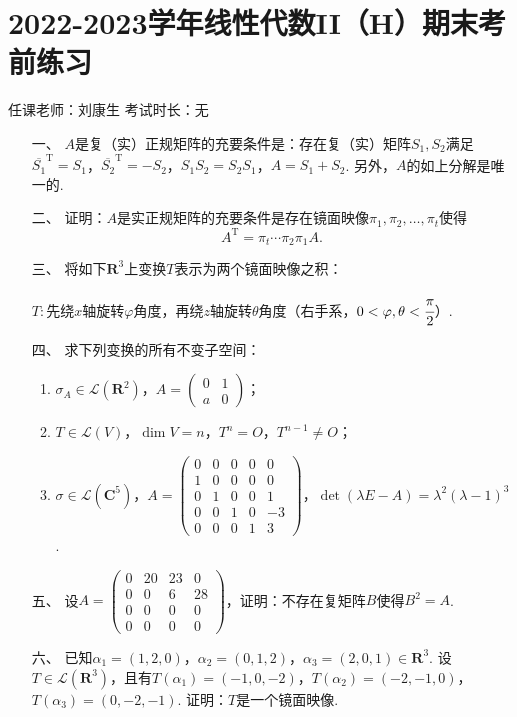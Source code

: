 \section*{2022-2023学年线性代数II（H）期末考前练习}

\begin{center}
    任课老师：刘康生\hspace{4em} 考试时长：无
\end{center}

\begin{enumerate}
	\item[一、]$A$是复（实）正规矩阵的充要条件是：存在复（实）矩阵$S_1,S_2$满足$\overline{S_1}^{\mathrm{T}}=S_1$，$\overline{S_2}^{\mathrm{T}}=-S_2$，$S_1S_2=S_2S_1$，$A=S_1+S_2$. 另外，$A$的如上分解是唯一的.
	\item[二、]证明：$A$是实正规矩阵的充要条件是存在镜面映像$\pi_1,\pi_2,\ldots,\pi_t$使得
    \[A^\mathrm{T}=\pi_t\cdots\pi_2\pi_1A.\]
	\item[三、]将如下$\mathbf{R}^3$上变换$T$表示为两个镜面映像之积：

    $T:$先绕$x$轴旋转$\varphi$角度，再绕$z$轴旋转$\theta$角度（右手系，$0<\varphi,\theta<\cfrac{\pi}{2}$）.
	\item[四、]求下列变换的所有不变子空间：
	\begin{enumerate}[label=(\arabic*)]
        \item $\sigma_A\in\mathcal{L}(\mathbf{R}^2)$，$A=\begin{pmatrix}
            0 & 1 \\ a & 0
        \end{pmatrix}$；

        \item $T\in\mathcal{L}(V)$，$\dim V=n$，$T^n=O$，$T^{n-1}\neq O$；

        \item $\sigma\in\mathcal{L}(\mathbf{C}^5)$，$A=\begin{pmatrix}
            0 & 0 & 0 & 0 & 0 \\ 1 & 0 & 0 & 0 & 0 \\ 0 & 1 & 0 & 0 & 1 \\ 0 & 0 & 1 & 0 & -3 \\ 0 & 0 & 0 & 1 & 3
        \end{pmatrix}$，$\det(\lambda E-A)=\lambda^2(\lambda-1)^3$.
    \end{enumerate}
	\item[五、]设$A=\begin{pmatrix}
        0 & 20 & 23 & 0 \\ 0 & 0 & 6 & 28 \\ 0 & 0 & 0 & 0 \\ 0 & 0 & 0 & 0
    \end{pmatrix}$，证明：不存在复矩阵$B$使得$B^2=A$.
	\item[六、]已知$\alpha_1=(1,2,0)$，$\alpha_2=(0,1,2)$，$\alpha_3=(2,0,1)\in\mathbf{R}^3$. 设$T\in\mathcal{L}(\mathbf{R}^3)$，且有$T(\alpha_1)=(-1,0,-2)$，$T(\alpha_2)=(-2,-1,0)$，$T(\alpha_3)=(0,-2,-1)$. 证明：$T$是一个镜面映像.


\end{enumerate}
